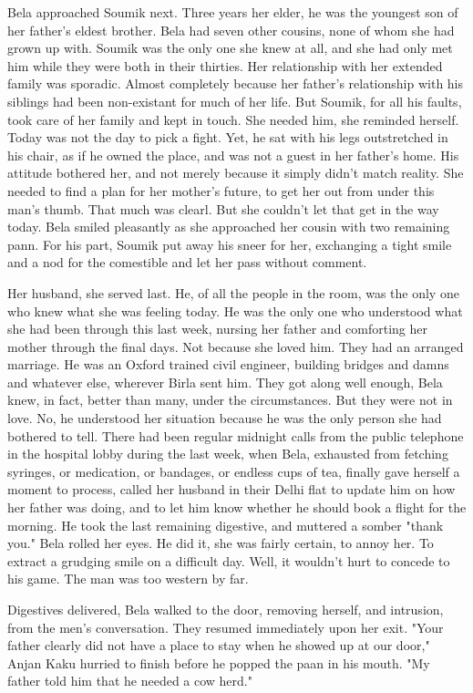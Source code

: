\documentclass{amsart}
\begin{document}
Bela approached Soumik next. Three years her elder, he was the youngest son of her father's eldest brother. Bela had seven other cousins, none of whom she had grown up with. Soumik was the only one she knew at all, and she had only met him while they were both in their thirties. Her relationship with her extended family was sporadic. Almost completely because her father's relationship with his siblings had been non-existant for much of her life. But Soumik, for all his faults, took care of her family and kept in touch. She needed him, she reminded herself. Today was not the day to pick a fight. Yet, he sat with his legs outstretched in his chair, as if he owned the place, and was not a guest in her father's home. His attitude bothered her, and not merely because it simply didn't match reality. She needed to find a plan for her mother's future, to get her out from under this man's thumb. That much was clearl. But she couldn't let that get in the way today. Bela smiled pleasantly as she approached her cousin with two remaining pann. For his part, Soumik put away his sneer for her, exchanging a tight smile and a nod for the comestible and let her pass without comment.

Her husband, she served last. He, of all the people in the room, was the only one who knew what she was feeling today. He was the only one who understood what she had been through this last week, nursing her father and comforting her mother through the final days. Not because she loved him. They had an arranged marriage. He was an Oxford trained civil engineer, building bridges and damns and whatever else, wherever Birla sent him. They got along well enough, Bela knew, in fact, better than many, under the circumstances. But they were not in love. No, he understood her situation because he was the only person she had bothered to tell. There had been regular midnight calls from the public telephone in the hospital lobby during the last week, when Bela, exhausted from fetching syringes, or medication, or bandages, or endless cups of tea, finally gave herself a moment to process, called her husband in their Delhi flat to update him on how her father was doing, and to let him know whether he should book a flight for the morning. He took the last remaining digestive, and muttered a somber "thank you." Bela rolled her eyes. He did it, she was fairly certain, to annoy her. To extract a grudging smile on a difficult day. Well, it wouldn't hurt to concede to his game. The man was too western by far.

Digestives delivered, Bela walked to the door, removing herself, and intrusion, from the men's conversation. They  resumed immediately upon her exit. "Your father clearly did not have a place to stay when he showed up at our door," Anjan Kaku hurried to finish before he popped the paan in his mouth. "My father told him that he needed a cow herd."
\end{document}
